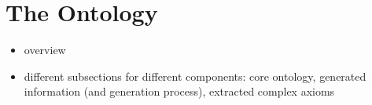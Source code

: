 \section{The Ontology}

\begin{itemize}
 \item overview
 \item different subsections for different components: core ontology,
 generated information (and generation process), extracted complex axioms
\end{itemize}

